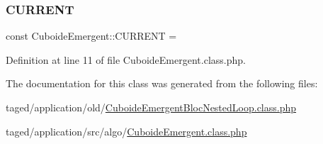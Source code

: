 \mbox{\label{class_cuboide_emergent_a7b90f304497d08479a309ffa9a2cedb8}} 
\subsubsection{\texorpdfstring{C\+U\+R\+R\+E\+NT}{CURRENT}}
{\footnotesize\ttfamily const Cuboide\+Emergent\+::\+C\+U\+R\+R\+E\+NT = \textquotesingle{}\textquotesingle{}}



Definition at line 11 of file Cuboide\+Emergent.\+class.\+php.



The documentation for this class was generated from the following files\+:\begin{DoxyCompactItemize}
\item 
taged/application/old/\hyperlink{_cuboide_emergent_bloc_nested_loop_8class_8php}{Cuboide\+Emergent\+Bloc\+Nested\+Loop.\+class.\+php}\item 
taged/application/src/algo/\hyperlink{_cuboide_emergent_8class_8php}{Cuboide\+Emergent.\+class.\+php}\end{DoxyCompactItemize}
